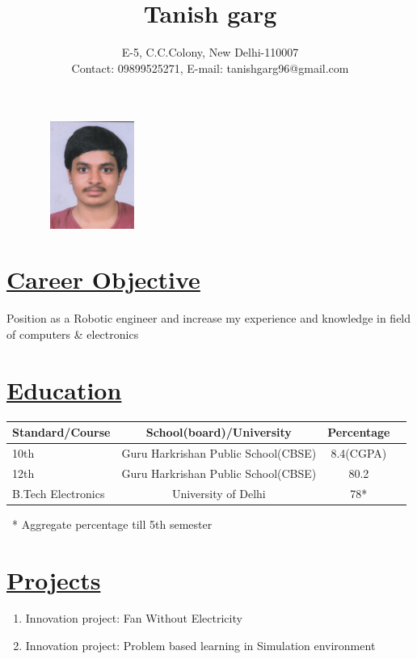\documentclass[14pt,a4paper,twoside]{article}
\begin{document}
	
	\title{Tanish garg}
		\author{E-5, C.C.Colony, New Delhi-110007 \\ Contact: 09899525271,  E-mail: tanishgarg96@gmail.com}
	\maketitle
	
	\begin{figure}[!h]
		\centering
		\includegraphics[width=3.5cm,height=3.5cm]{passportpic001}
	\end{figure}		
		
	\section*{\underline{\textbf{Career Objective}}}

	Position as a Robotic engineer and increase my experience and knowledge in field of computers \& electronics
	
	\section*{\underline{\textbf{Education}}}
		\begin{tabular}{|l||c||c||r|}
			\hline
			Standard/Course & School(board)/University & Percentage \\
			\hline
			10th & Guru Harkrishan Public School(CBSE) & 8.4(CGPA)\\
			\hline
			12th & Guru Harkrishan Public School(CBSE) & 80.2\\
			\hline
			B.Tech Electronics & University of Delhi & 78*\\
			
		\end{tabular}
		
		
	  \ * Aggregate percentage till 5th semester	
	\section*{\underline{\textbf{Projects}}}
		\begin{enumerate}
			\item Innovation project: Fan Without Electricity
			\item Innovation project: Problem based learning in Simulation environment 
		\end{enumerate}
	
\end{document}
